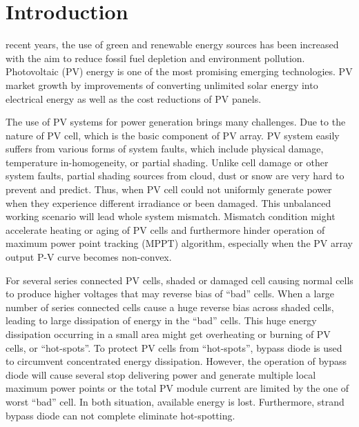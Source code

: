 \documentclass[journal]{IEEEtran}
\begin{document}
\IEEEpeerreviewmaketitle



\section{Introduction}
 recent years, the use of green and renewable energy sources has been increased with the aim to reduce fossil fuel depletion and environment pollution.
Photovoltaic (PV) energy is one of the most promising emerging technologies.
PV market growth by improvements of converting unlimited solar energy into electrical energy as well as the cost reductions of PV panels.

The use of PV systems for power generation brings many challenges.
Due to the nature of PV cell, which is the basic component of PV array.
PV system easily suffers from various forms of system faults, which include physical damage, temperature in-homogeneity, or partial shading.
Unlike cell damage or other system faults, partial shading sources from cloud, dust or snow are very hard to prevent and predict.
Thus, when PV cell could not uniformly generate power when they experience different irradiance or been damaged.
This unbalanced working scenario will lead whole system mismatch.
Mismatch condition might accelerate heating or aging of PV cells and furthermore hinder operation of maximum power point tracking (MPPT) algorithm, especially when the PV array output P-V curve becomes non-convex\cite{islam2018performance}.

For several series connected PV cells, shaded or damaged cell causing normal cells to produce higher voltages that may reverse bias of ``bad'' cells.
When a large number of series connected cells cause a huge reverse bias across shaded cells, leading to large dissipation of energy in the ``bad'' cells.
This huge energy dissipation occurring in a small area might get overheating or burning of PV cells, or ``hot-spots''.
To protect PV cells from ``hot-spots'', bypass diode is used to circumvent concentrated energy dissipation.
However, the operation of bypass diode will cause several stop delivering power and generate multiple local maximum power points or the total PV module current are limited by the one of worst ``bad'' cell.
In both situation, available energy is lost.
Furthermore, strand bypass diode can not complete eliminate hot-spotting\cite{kim2015reexamination}.
\end{document}
